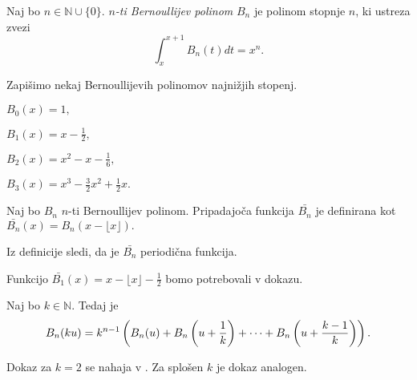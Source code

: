 \documentclass[mat1]{fmfdelo}
\begin{document}
\begin{definicija}
Naj bo $n \in \mathbb{N} \cup \{0\}.$ \emph{$n$-ti Bernoullijev polinom} $B_{n}$ je polinom stopnje $n$, ki ustreza zvezi
\begin{equation}
\int_{x}^{x+1} B_{n}(t) dt = x^{n}.
\end{equation}
\end{definicija}

\begin{primer}
Zapišimo nekaj Bernoullijevih polinomov najnižjih stopenj.

\( B_{0}(x) = 1, \)

\( B_{1}(x) = x - \frac{1}{2}, \)

\( B_{2}(x) = x^2 - x - \frac{1}{6}, \)

\( B_{3}(x) = x^3 - \frac{3}{2} x^2 + \frac{1}{2} x. \)
\end{primer}

\begin{definicija}
Naj bo $B_{n}$ $n$-ti Bernoullijev polinom. Pripadajoča funkcija $ \bar{B_{n}} $ je definirana kot $ \bar{B_{n}}(x) = B_{n}(x - \lfloor x \rfloor). $
\end{definicija}

\begin{opomba}
Iz definicije sledi, da je $ \bar{B_{n}} $ periodična funkcija.
\end{opomba}

\begin{primer}
Funkcijo $ \bar{B_{1}}(x) = x - \lfloor x \rfloor - \frac{1}{2} $ bomo potrebovali v dokazu.
\end{primer}

\begin{trditev}
Naj bo $k \in \mathbb{N}$. Tedaj je
\begin{equation}
\label{Eq:B_{n}(ku)}
B_{n}(ku) = k^{n-1} \left ( B_{n}(u) + B_{n} \left( u + \frac{1}{k} \right) + \dots + B_{n} \left( u + \frac{k-1}{k} \right) \right).
\end{equation}
\end{trditev}

\begin{dokaz}
Dokaz za $k=2$ se nahaja v \cite[poglavje 6.2, str.~102 -- 103]{zetafunction}. Za splošen $k$ je dokaz analogen.
\end{dokaz}

\end{document}
